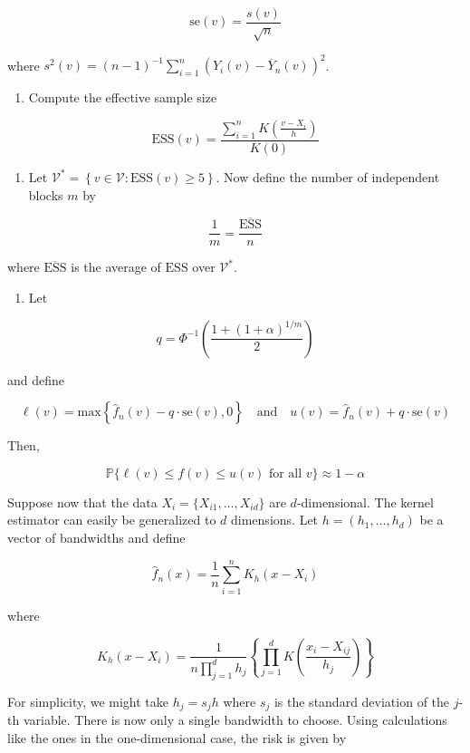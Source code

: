 \[ \text{se}(v) = \frac{s(v)}{\sqrt{n}} \]

where
\(s^{2}(v) = (n - 1)^{-1} \sum_{i=1}^{n} ( Y_{i}(v) - \overline{Y}_{n}(v) )^{2}\).

\begin{enumerate}[tightlist,label={\arabic*.},resume]
\item
  Compute the effective sample size
\end{enumerate}

\[ \text{ESS}(v) = \frac{\sum_{i=1}^{n} K\left( \frac{v - X_{i}}{h} \right)}{K(0)} \]

\begin{enumerate}[tightlist,label={\arabic*.},resume]
\item
  Let
  \(\mathcal{V}^* = \left\{ v \in \mathcal{V} : \text{ESS}(v) \geq 5 \right\}\).
  Now define the number of independent blocks \(m\) by
\end{enumerate}

\[ \frac{1}{m} = \frac{\overline{\text{ESS}}}{n} \]

where \(\overline{\text{ESS}}\) is the average of \(\text{ESS}\) over
\(\mathcal{V}^*\).

\begin{enumerate}[tightlist,label={\arabic*.},resume]
\item
  Let
\end{enumerate}

\[ q = \Phi^{-1} \left( \frac{1 + (1 + \alpha)^{1/m}}{2} \right) \]

and define

\[ \ell(v) = \text{max} \left\{ \hat{f}_{n}(v) - q \cdot \text{se}(v), 0 \right\}
\quad \text{and} \quad
u(v) = \hat{f}_{n}(v) + q \cdot \text{se}(v)\]

Then,

\[ \mathbb{P} \Big\{ \ell(v) \leq f(v) \leq u(v) \text{ for all } v \Big\} \approx 1 - \alpha \]

Suppose now that the data \(X_{i} = \{ X_{i1}, \dots, X_{id} \}\) are
\(d\)-dimensional. The kernel estimator can easily be generalized to
\(d\) dimensions. Let \(h = (h_{1}, \dots, h_d)\) be a vector of
bandwidths and define

\[ \hat{f}_{n}(x) = \frac{1}{n} \sum_{i=1}^{n} K_h(x - X_{i}) \]

where

\[ K_h(x - X_{i}) = \frac{1}{n \prod_{j=1}^{d} h_{j}} \left\{ \prod_{j=1}^{d} K \left( \frac{x_{i} - X_{ij}}{h_{j}} \right) \right\} \]

For simplicity, we might take \(h_{j} = s_{j} h\) where \(s_{j}\) is the
standard deviation of the \(j\)-th variable. There is now only a single
bandwidth to choose. Using calculations like the ones in the
one-dimensional case, the risk is given by


